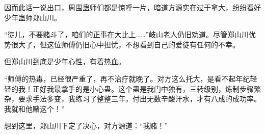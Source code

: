 \begin{this_body}
因而此话一说出口，周围蛊师们都是惊呼一片，暗道方源实在过于拿大，纷纷看好少年蛊师郑山川。

“徒儿，不要赌斗了，咱们的正事在大比上……”岐山老人仍旧劝道。尽管郑山川优势很大了，但这位师傅仍旧心中担忧，不想看到自己的爱徒有任何的不幸。

但郑山川到底是少年心性，有着热血。

“师傅的热毒，已经很严重了，再不治疗就晚了。对方这么托大，是看不起年纪轻轻的我！正好我最拿手的是小心蛊。这个蛊是我门中独有，三转级别，炼制步骤繁杂，要求手法多变，我练习了整整三年，付出无数辛酸汗水，才有八成的成功率。我就和他赌这个！”

想到这里，郑山川下定了决心，对方源道：“我赌！”

\end{this_body}

